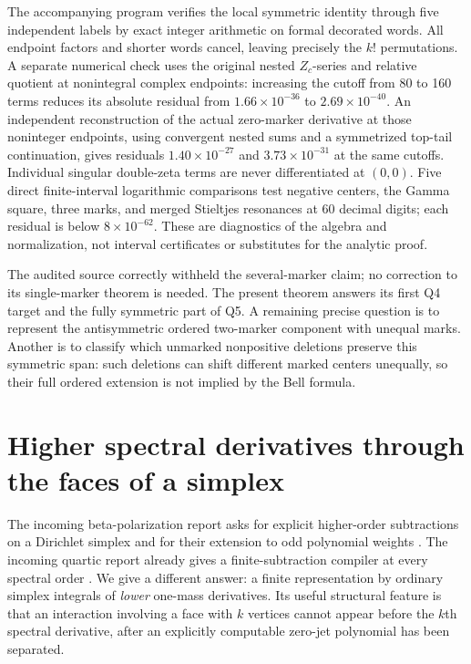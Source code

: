 \documentclass[11pt,a4paper]{article}
\numberwithin{equation}{section}
\theoremstyle{definition}
\theoremstyle{remark}
\begin{document}
The accompanying program verifies the local symmetric identity through
five independent labels by exact integer arithmetic on formal decorated
words.  All endpoint factors and shorter words cancel, leaving precisely
the \(k!\) permutations.  A separate numerical check uses the original
nested \(Z_c\)-series and relative quotient at nonintegral complex
endpoints: increasing the cutoff from 80 to 160 terms reduces its
absolute residual from \(1.66\times10^{-36}\) to
\(2.69\times10^{-40}\).  An independent reconstruction of the actual
zero-marker derivative at those noninteger endpoints, using convergent
nested sums and a symmetrized top-tail continuation, gives residuals
\(1.40\times10^{-27}\) and \(3.73\times10^{-31}\) at the same
cutoffs.  Individual singular double-zeta terms are never differentiated
at \((0,0)\).  Five direct finite-interval logarithmic
comparisons test negative centers, the Gamma square, three marks, and
merged Stieltjes resonances at 60 decimal digits; each residual is below
\(8\times10^{-62}\).  These are diagnostics of the algebra and
normalization, not interval certificates or substitutes for the
analytic proof.

The audited source correctly withheld the several-marker claim; no
correction to its single-marker theorem is needed.  The present theorem
answers its first Q4 target and the fully symmetric part of Q5.  A
remaining precise question is to represent the antisymmetric ordered
two-marker component with unequal marks.  Another is to classify which
unmarked nonpositive deletions preserve this symmetric span: such
deletions can shift different marked centers unequally, so their full
ordered extension is not implied by the Bell formula.



\section{Higher spectral derivatives through the faces of a simplex}
\label{sd:sec:main}

The incoming beta-polarization report asks for explicit higher-order
subtractions on a Dirichlet simplex and for their extension to odd
polynomial weights \cite[Further research, items 3--4]{sd:HigherDefects}.
The incoming quartic report already gives a finite-subtraction compiler
at every spectral order \cite[Section 5]{RepoQuartic}.  We give a different
answer: a finite representation by ordinary simplex integrals of
\emph{lower} one-mass derivatives.  Its useful structural feature is that
an interaction involving a face with $k$ vertices cannot appear before
the $k$th spectral derivative, after an explicitly computable zero-jet
polynomial has been separated.
\end{document}
